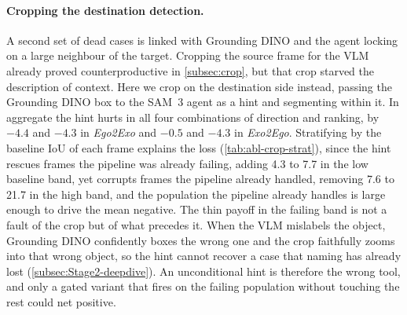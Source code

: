 \paragraph{Cropping the destination detection.}
A second set of dead cases is linked with Grounding DINO and the agent locking on a large neighbour of the target. Cropping the source frame for the VLM already proved counterproductive in \cref{subsec:crop}, but that crop starved the description of context. Here we crop on the destination side instead, passing the Grounding DINO box to the SAM~3 agent as a hint and segmenting within it. In aggregate the hint hurts in all four combinations of direction and ranking, by $-4.4$ and $-4.3$ in \textit{Ego2Exo} and $-0.5$ and $-4.3$ in \textit{Exo2Ego}. Stratifying by the baseline IoU of each frame explains the loss (\cref{tab:abl-crop-strat}), since the hint rescues frames the pipeline was already failing, adding 4.3 to 7.7 in the low baseline band, yet corrupts frames the pipeline already handled, removing 7.6 to 21.7 in the high band, and the population the pipeline already handles is large enough to drive the mean negative. The thin payoff in the failing band is not a fault of the crop but of what precedes it. When the VLM mislabels the object, Grounding DINO confidently boxes the wrong one and the crop faithfully zooms into that wrong object, so the hint cannot recover a case that naming has already lost (\cref{subsec:Stage2-deepdive}). An unconditional hint is therefore the wrong tool, and only a gated variant that fires on the failing population without touching the rest could net positive.


